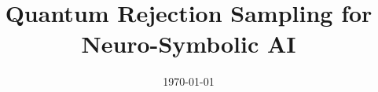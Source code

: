 \documentclass[aps,onecolumn,nofootinbib,pra]{article}
\begin{document}
    \title{Quantum Rejection Sampling for Neuro-Symbolic AI}

    \maketitle
    \date{\today}
    \begin{abstract}
        
    \end{abstract}

    \tableofcontents

    
    
    
    
    
    

    \appendix

    

    
    
\end{document}
